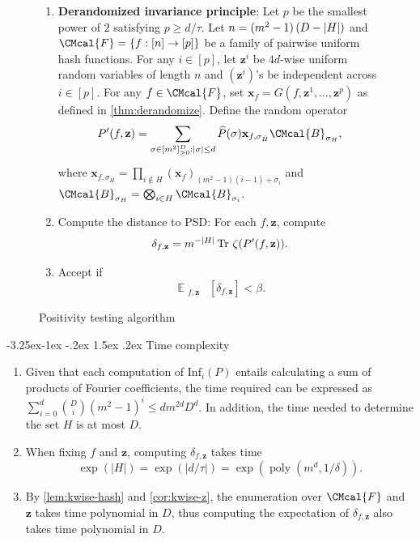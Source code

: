 \documentclass[10pt,a4paper]{article}
\makeatletter
\renewcommand{\subsection}{\@startsection{subsection}{2}{\z@}%
             {-3.25ex\@plus -1ex \@minus -.2ex}%
             {1.5ex \@plus .2ex}%
             {\normalfont\large\scshape\bfseries}}
\def\B{\CMcal{B}}
\def\F{\CMcal{F}}
\theoremstyle{plain}
\theoremstyle{definition}
\newcommand {\minusspace} {\: \! \!}
\newcommand {\Fn} [2] {\ensuremath{ #1 \minusspace \Br{ #2 } }}
\newcommand {\set} [1] {\ensuremath{ \left\lbrace #1 \right\rbrace }}
\newcommand {\br} [1] {\ensuremath{ \left( #1 \right) }}
\newcommand {\Br} [1] {\ensuremath{ \left[ #1 \right] }}
\newcommand {\ab} [1] {\ensuremath{ \left| #1 \right| }}
\DeclarePairedDelimiter{\abs}{\lvert}{\rvert}
\DeclareMathOperator*{\bigE}{\mathbb{E}}
\newcommand {\expec} [2] {\Fn{\bigE_{\substack{#1}}}{#2}}
\newcommand {\Tr} {\ensuremath{ \mathrm{Tr} }}
\newenvironment{Algorithm}{\begin{framed}}{\end{framed}}
\newcommand{\randz}{\ensuremath{\mathbf{z}}}
\newcommand{\randx}{\ensuremath{\mathbf{x}}}
\newcommand{\infi}[1]{\ensuremath{\mathrm{Inf}_i}\br{#1}}
\newcommand{\poly} {\ensuremath{\operatorname{poly}}}
\newcommand{\dlbo} {\ensuremath{{D}}}
\newcommand{\dldd} {\ensuremath{{d}}}
\newcommand{\1}{\mathbb{1}} %
\makeatother
\begin{document}
\begin{figure}
\begin{Algorithm}
\begin{description}
\begin{enumerate}
                For each $i$, compute the influence
                $\infi{P}=\sum_{\sigma: \sigma_i\neq 0}\widehat{P}(\sigma)^2$.
                Let $H=\set{i: \infi{P}>\tau}$.
          \item \textbf{Derandomized invariance principle}:
                Let $p$ be the smallest power of $2$ satisfying $p\ge\dldd/\tau$.
                Let $n=(m^2-1)\br{\dlbo-\abs{H}}$ and $\F=\set{f: [n]\to[p]}$ be a family of pairwise uniform hash functions.
                For any $i\in[p]$, let $\randz^i$ be $4d$-wise uniform random variables of length $n$ and $\br{\randz^i}$'s be independent across $i\in[p]$. 
                For any $f\in\F$, set $\randx_f=G\br{f,\randz^1,\dots,\randz^p}$ as defined in \cref{thm:derandomize}. Define the random operator
                \begin{equation}\label{eq:operator-after-derandomization}
                 P^\prime(f, \randz) = \sum_{\sigma\in[m^2]_{\ge 0}^{\dlbo}:\ab{\sigma}\le d}\widehat{P}(\sigma)\randx_{f,\sigma_{\bar{H}}}\B_{\sigma_H},
                \end{equation}
                where $\randx_{f,\sigma_{\bar{H}}} = \prod_{i\notin H}\br{\randx_f}_{(m^2-1)(i-1)+\sigma_i}$ and $\B_{\sigma_H}=\bigotimes_{i\in H}\B_{\sigma_i}$.
          \item Compute the distance to PSD: For each $f, \randz$, compute
                $$\delta_{f, \randz} = {m^{-\abs{H}}}\,\Tr~\zeta(P^\prime(f, \randz)).$$
          \item Accept if
                $$\expec{f, \randz}{\delta_{f, \randz}}<\beta.$$
        \end{enumerate}
\end{description}
\end{Algorithm}
\caption{Positivity testing algorithm}\label{fig:ptalg}
\end{figure}

\subsection{Time complexity}
\begin{enumerate}
  \item 
  Given that each computation of $\infi{P}$ entails calculating a sum of products of Fourier coefficients, the time required can be expressed as $\sum_{i=0}^d{\binom{\dlbo}{i}}\br{m^2-1}^i \le dm^{2d}\dlbo^d$. In addition, the time needed to determine the set $H$ is at most $\dlbo$.
 

  \item 
        When fixing $f$ and $\randz$, computing $\delta_{f, \randz}$ takes time
        $$\exp\br{\ab{H}} = \exp\br{\ab{d/\tau}} =\exp\br{\poly\br{m^d, 1/\delta}}.$$
        
  \item By \cref{lem:kwise-hash} and \cref{cor:kwise-z}, the enumeration over $\F$ and $\randz$ takes time polynomial in $\dlbo$, thus computing the expectation of $\delta_{f, \randz}$ also takes time polynomial in $\dlbo$.
\end{enumerate}
\end{document}
